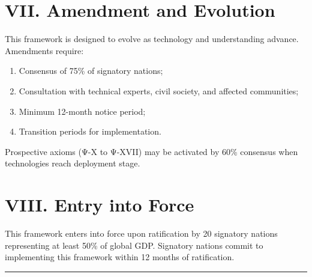 \vspace{0.5cm}

\section*{VII. Amendment and Evolution}

This framework is designed to evolve as technology and understanding advance. Amendments require:

\begin{enumerate}[leftmargin=1.5cm]
    \item Consensus of 75\% of signatory nations;
    \item Consultation with technical experts, civil society, and affected communities;
    \item Minimum 12-month notice period;
    \item Transition periods for implementation.
\end{enumerate}

Prospective axioms (Ψ-X to Ψ-XVII) may be activated by 60\% consensus when technologies reach deployment stage.

\vspace{0.5cm}

\section*{VIII. Entry into Force}

This framework enters into force upon ratification by 20 signatory nations representing at least 50\% of global GDP. Signatory nations commit to implementing this framework within 12 months of ratification.

\vspace{1cm}

\begin{center}
\rule{0.7\textwidth}{0.4pt}
\end{center}

\cleardoublepage
